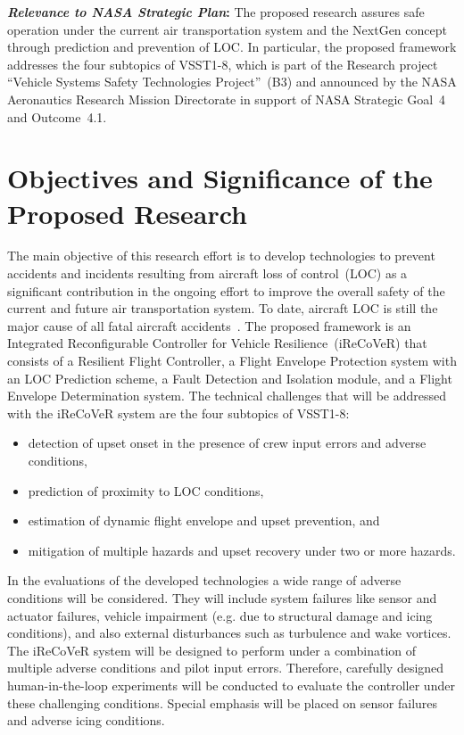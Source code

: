 \documentclass[letter,onecolumn,12pt]{aiaa-tc}
\begin{document}
\medskip

\textbf{\emph{Relevance to NASA Strategic Plan}:} The proposed research assures safe operation under the current air transportation system and the NextGen concept through prediction and prevention of LOC. In particular, the proposed framework addresses the four subtopics of \mbox{VSST1-8}, which is part of the Research project ``Vehicle Systems Safety Technologies Project''~(B3) and announced by the NASA Aeronautics Research Mission Directorate in support of NASA Strategic Goal~4 and Outcome~4.1.




\section{Objectives and Significance of the Proposed Research}

The main objective of this research effort is to develop technologies to prevent accidents and incidents resulting from aircraft loss of control~(LOC) as a significant contribution in the ongoing effort to improve the overall safety of the current and future air transportation system. To date, aircraft LOC is still the major cause of all fatal aircraft accidents~\cite{LOC04_LOCMetrics,LOC_2007,MST08_upsets,LOC_2010,LOC10_Belcastro_analysis,LOC10_Belcastro_concept}. The proposed framework is an Integrated Reconfigurable Controller for Vehicle Resilience~\mbox{(iReCoVeR)} that consists of a Resilient Flight Controller, a Flight Envelope Protection system with an LOC Prediction scheme, a Fault Detection and Isolation module, and a Flight Envelope Determination system. The technical challenges that will be addressed with the iReCoVeR system are the four subtopics of VSST1-8:
\begin{itemize}
\setlength{\itemsep}{-3pt}
\vspace{-2mm}
    \item detection of upset onset in the presence of crew input errors and adverse conditions,
    \item prediction of proximity to LOC conditions,
    \item estimation of dynamic flight envelope and upset prevention, and
    \item mitigation of multiple hazards and upset recovery under two or more hazards.
\end{itemize}
In the evaluations of the developed technologies a wide range of adverse conditions will be considered. They will include system failures like sensor and actuator failures, vehicle impairment (e.g. due to structural damage and icing conditions), and also external disturbances such as turbulence and wake vortices. The iReCoVeR system will be designed to perform under a combination of multiple adverse conditions and pilot input errors. Therefore, carefully designed human-in-the-loop experiments will be conducted to evaluate the controller under these challenging conditions. Special emphasis will be placed on sensor failures and adverse icing conditions.
\end{document}
